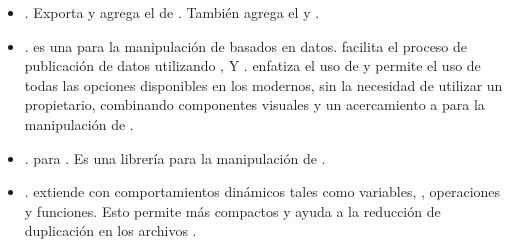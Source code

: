 \begin{itemize}
		\item
			\textbf{\bunyanPackage}. Exporta y agrega el \moduleAS de \loggingCPT \bunyanNAME. También agrega el \clientAS \browserifyNAME y \bunyanprettyStreamMETEOR.
		\item
			\textbf{\dThreePackage}. \dddNAME es una \libraryPC	\javaScriptNAME para la manipulación de  \documentsDB basados en datos. \dThreePackage facilita el proceso de publicación de datos utilizando \htmlNAME, \svgNAME Y \cssNAME. \dThreePackage enfatiza el uso de \webStandardINT y permite el uso de todas las opciones disponibles en los \browsersINT modernos, sin la necesidad de utilizar un \frameworkPC propietario, combinando componentes visuales y un acercamiento a \dataDrivenCPT para la manipulación de \htmldomNAME.
		\item
			\textbf{\undStringLatestPackage}. \undStringLatestMETEOR \packageAS para \meteorNAME. Es una librería para la manipulación de \stringsPL.
		\item
			\textbf{\lessPackage}. \lessNAME extiende \cssNAME con comportamientos dinámicos tales como variables, \mixinsNAME, operaciones y funciones. Esto permite  \stylesheetsNAME más compactos y ayuda a la reducción de duplicación en los archivos \cssNAME. 




\end{itemize}
